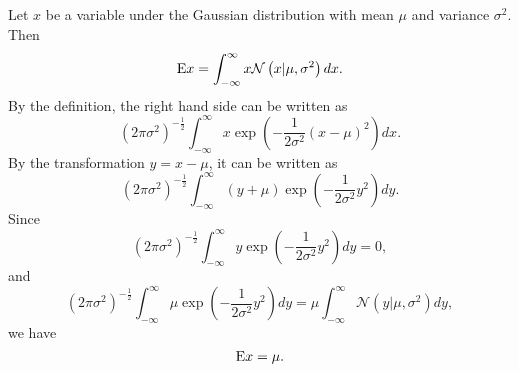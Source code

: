 \subsection{}
Let $x$ be a variable under the Gaussian distribution with mean $\mu$ and variance $\sigma ^ 2$.
Then
%
\begin{equation}
{\rm E} x = \int_{-\infty}^{\infty} x \mathcal{N} \left( x | \mu, \sigma ^ 2 \right) dx.
\end{equation}
%
By the definition, the right hand side can be written as
%
\begin{equation}
\left( 2 \pi \sigma ^ 2 \right) ^ {-\frac{1}{2}} \int_{-\infty}^{\infty} x \exp \left( -\frac{1}{2 \sigma ^ 2} (x - \mu) ^ 2 \right) dx.
\end{equation}
%
By the transformation $y = x - \mu$, it can be written as 
%
\begin{equation}
\left( 2 \pi \sigma ^ 2 \right) ^ {-\frac{1}{2}} \int_{-\infty}^{\infty} (y + \mu) \exp \left( -\frac{1}{2 \sigma ^ 2}y ^ 2 \right) dy.
\end{equation}
%
Since 
%
\begin{equation}
\left( 2 \pi \sigma ^ 2 \right) ^ {-\frac{1}{2}} \int_{-\infty}^{\infty} y \exp \left( -\frac{1}{2 \sigma ^ 2}y ^ 2 \right) dy = 0,
\end{equation}
%
and
%
\begin{equation}
\left( 2 \pi \sigma ^ 2 \right) ^ {-\frac{1}{2}} \int_{-\infty}^{\infty} \mu \exp \left( -\frac{1}{2 \sigma ^ 2}y ^ 2 \right) dy = \mu \int_{- \infty}^{\infty} \mathcal{N} \left( y | \mu, \sigma ^ 2 \right) dy,
\end{equation}
%
we have
%
\begin{equation}
{\rm E} x = \mu.
\end{equation}
%

